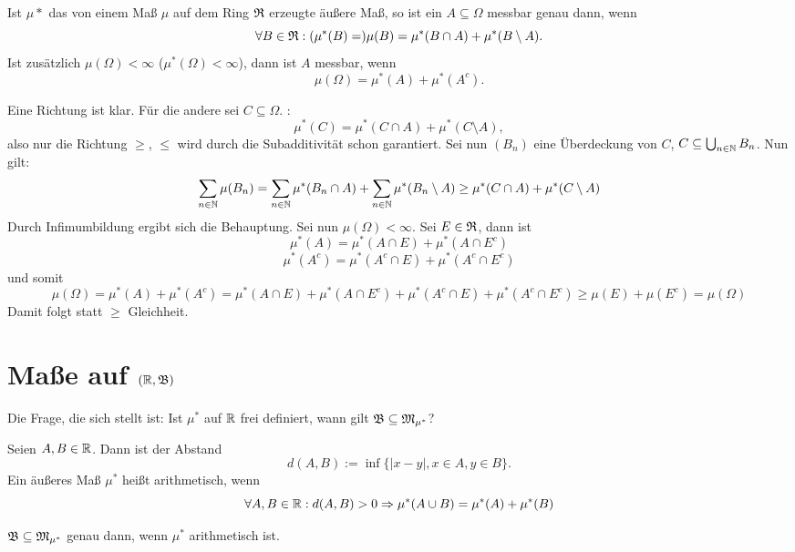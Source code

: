 			\begin{satz}
				Ist $\mu*$ das von einem Maß $\mu$ auf dem Ring $\mathfrak{R}$ erzeugte äußere Maß, so ist ein $A\subseteq \Omega$ messbar genau dann, wenn
				\[ \forall B\in\mathfrak{R}: (\mu^*(B)=)\mu(B)=\mu^*(B\cap A)+\mu^*(B\setminus A). \]
				Ist zusätzlich $\mu(\Omega)<\infty$ ($\mu^*(\Omega)<\infty$), dann ist $A$ messbar, wenn 
				\[ \mu(\Omega)=\mu^*(A)+\mu^*(A^c). \]
			\end{satz}
			
			\begin{bew}
				Eine Richtung ist klar. \newline
				Für die andere sei $C\subseteq \Omega$. \newline
				\zz:
				\[ \mu^*(C)=\mu^*(C\cap A)+\mu^*(C\setminus A), \]
				also nur die Richtung $\ge$, $\le$ wird durch die Subadditivität schon garantiert. Sei nun $(B_n)$ eine Überdeckung von $C$, $C\subseteq \bigcup_{n\in\mathbb{N}} B_n$. Nun gilt:
				\[ \sum_{n\in\mathbb{N}}\mu(B_n)=\sum_{n\in\mathbb{N}} \mu^*(B_n\cap A) + \sum_{n\in\mathbb{N}}\mu^*(B_n\setminus A)\ge \mu^*(C\cap A)+\mu^*(C\setminus A) \]
				Durch Infimumbildung ergibt sich die Behauptung.   \newline
				Sei nun $\mu(\Omega)<\infty$. Sei $E\in\mathfrak{R}$, dann ist
				\[ \mu^*(A)=\mu^*(A\cap E)+\mu^*(A\cap E^c) \]
				\[ \mu^*(A^c)=\mu^*(A^c\cap E)+\mu^*(A^c\cap E^c) \]
				und somit 
				\[ \mu(\Omega)=\mu^*(A)+\mu^*(A^c)=\mu^*(A\cap E)+\mu^*(A\cap E^c)+\mu^*(A^c\cap E)+\mu^*(A^c\cap E^c)\ge \mu(E)+\mu(E^c)=\mu(\Omega) \]
				Damit folgt statt $\ge$ Gleichheit. 
			\end{bew}
			
		\section{Maße auf $(\mathbb{R}, \mathfrak{B})$}
			
			Die Frage, die sich stellt ist: Ist $\mu^*$ auf $\mathbb{R}$ frei definiert, wann gilt $\mathfrak{B}\subseteq \mathfrak{M}_{\mu^*}$?
			
			\begin{defi}
				Seien $A,B\in\mathbb{R}$. Dann ist der Abstand 
				\[ d(A,B):=\inf\{|x-y|, x\in A, y\in B\}. \]
				Ein äußeres Maß $\mu^*$ heißt arithmetisch, wenn 
				\[ \forall A,B\in\mathbb{R}: d(A,B)>0\Rightarrow \mu^*(A\cup B)=\mu^*(A)+\mu^*(B) \]
			\end{defi}
			
			\begin{satz} 
				$\mathfrak{B}\subseteq \mathfrak{M}_{\mu^*}$ genau dann, wenn $\mu^*$ arithmetisch ist.
			\end{satz} 
			
